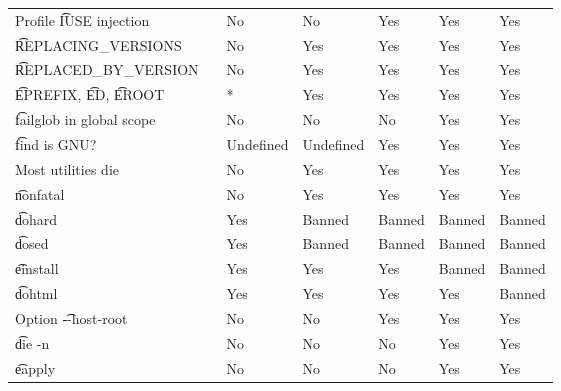 \begin{landscape}
\begin{longtable}{llP{7.5em}P{7.5em}P{7.5em}P{7.5em}P{7.5em}}
Profile \t{IUSE} injection &  &
    No & No & Yes & Yes & Yes \\

\t{REPLACING_VERSIONS} &  &
    No & Yes & Yes & Yes & Yes \\

\t{REPLACED_BY_VERSION} &  &
    No & Yes & Yes & Yes & Yes \\

\t{EPREFIX}, \t{ED}, \t{EROOT} &  &
    * & Yes & Yes & Yes & Yes \\

\t{failglob} in global scope &  &
    No & No & No & Yes & Yes \\

\t{find} is GNU? &  &
    Undefined & Undefined & Yes & Yes & Yes \\

Most utilities die &  &
    No & Yes & Yes & Yes & Yes \\

\t{nonfatal} &  &
    No & Yes & Yes & Yes & Yes \\

\t{dohard} &  &
    Yes & Banned & Banned & Banned & Banned \\

\t{dosed} &  &
    Yes & Banned & Banned & Banned & Banned \\

\t{einstall} &  &
    Yes & Yes & Yes & Banned & Banned \\

\t{dohtml} &  &
    Yes & Yes & Yes & Yes & Banned \\

Option \t{-{}-host-root} &  &
    No & No & Yes & Yes & Yes \\

\t{die -n} &  &
    No & No & No & Yes & Yes \\

\t{eapply} &  &
    No & No & No & Yes & Yes \\


\end{longtable}
\end{landscape}
